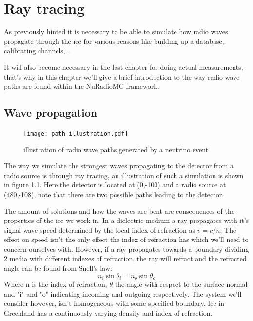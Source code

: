 \chapter{Ray tracing}
\label{chap:RT}
As previously hinted it is necessary to be able to simulate how radio waves
propagate through the ice for various reasons like building up a database, calibrating channels,...

It will also become necessary in the last chapter for doing actual measurements,
that's why in this chapter we'll give a brief introduction to the way radio wave
paths are found within the NuRadioMC framework.
\section{Wave propagation}
\begin{figure}[h!]
	\centering
	\texttt{[image: path\_illustration.pdf]}
	\label{fig:PathIllu}
	\caption{illustration of radio wave paths generated by a neutrino event}
\end{figure}
The way we simulate the strongest waves propagating to the detector from a
radio source is through ray tracing, an illustration of such a simulation is
shown in figure \ref{fig:PathIllu}.  Here the detector is located at (0,-100)
and a radio source at (480,-108), note that there are two possible paths
leading to the detector.

The amount of solutions and how the waves are bent are consequences of the
properties of the ice we work in.  In a dielectric medium a ray propagates with
it's signal wave-speed determined by the local index of refraction as $v =
c/n$.   The effect on speed isn't the only effect the index of refraction has
which we'll need to concern ourselves with. However, if a ray propagates towards
a boundary dividing 2 media with different indexes of refraction, the ray will
refract and the refracted angle can be found from Snell's law:
\begin{equation}
	n_i\sin{\theta_i} = n_o\sin{\theta_o}
\end{equation}
Where n is the index of refraction, $\theta$ the angle with respect to the
surface normal and "i" and "o" indicating incoming and outgoing respectively.
The system we'll consider however, isn't homogeneous with some specified
boundary. Ice in Greenland has a continuously varying density and
index of refraction.

